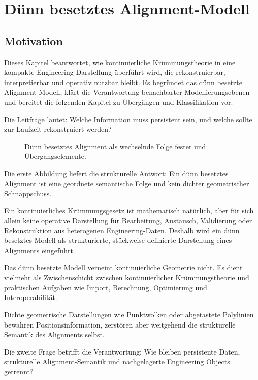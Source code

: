 \chapter{Dünn besetztes Alignment-Modell}

\section*{Motivation}

Dieses Kapitel beantwortet, wie kontinuierliche Krümmungstheorie in eine
kompakte Engineering-Darstellung überführt wird, die rekonstruierbar,
interpretierbar und operativ nutzbar bleibt. Es begründet das dünn besetzte
Alignment-Modell, klärt die Verantwortung benachbarter Modellierungsebenen und
bereitet die folgenden Kapitel zu Übergängen und Klassifikation vor.

Die Leitfrage lautet: Welche Information muss persistent sein, und welche
sollte zur Laufzeit rekonstruiert werden?

\begin{figure}[htbp]
\centering

\caption{Dünn besetztes Alignment als wechselnde Folge fester und Übergangselemente.}
\label{fig:sparse-model-structure}
\end{figure}

Die erste Abbildung liefert die strukturelle Antwort: Ein dünn besetztes
Alignment ist eine geordnete semantische Folge und kein dichter geometrischer
Schnappschuss.

Ein kontinuierliches Krümmungsgesetz ist mathematisch natürlich, aber für sich
allein keine operative Darstellung für Bearbeitung, Austausch, Validierung
oder Rekonstruktion aus heterogenen Engineering-Daten. Deshalb wird ein dünn
besetztes Modell als strukturierte, stückweise definierte Darstellung eines
Alignments eingeführt.

Das dünn besetzte Modell verneint kontinuierliche Geometrie nicht. Es dient
vielmehr als Zwischenschicht zwischen kontinuierlicher Krümmungstheorie und
praktischen Aufgaben wie Import, Berechnung, Optimierung und
Interoperabilität.

Dichte geometrische Darstellungen wie Punktwolken oder abgetastete Polylinien
bewahren Positionsinformation, zerstören aber weitgehend die strukturelle
Semantik des Alignments selbst.

Die zweite Frage betrifft die Verantwortung: Wie bleiben persistente Daten,
strukturelle Alignment-Semantik und nachgelagerte Engineering Objects getrennt?

